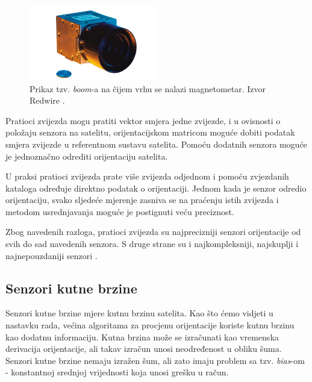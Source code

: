 \documentclass[times, utf8, diplomski, numeric]{templates/template}
\begin{document}
{{{{                \begin{figure}[htb]
                \centering
                \includegraphics[width=0.5\textwidth]{images/star_tracker.png}
                \caption{Prikaz tzv. \emph{boom}-a na čijem vrhu se nalazi magnetometar. Izvor Redwire \cite{starTrackerCite}.}
                \label{fig:star_tracker}
                \end{figure}

                Pratioci zvijezda mogu pratiti vektor smjera jedne zvijezde, i u ovisnosti o položaju senzora na satelitu, orijentacijskom matricom moguće dobiti podatak smjera zvijezde u referentnom sustavu satelita. Pomoću dodatnih senzora moguće je jednoznačno odrediti orijentaciju satelita. 

                U praksi pratioci zvijezda prate više zvijezda odjednom i pomoću zvjezdanih kataloga \cite{starCatalogs} određuje direktno podatak o orijentaciji. Jednom kada je senzor odredio orijentaciju, svako sljedeće mjerenje zasniva se na praćenju istih zvijezda i metodom usrednjavanja moguće je postignuti veću preciznost. 

                Zbog navedenih razloga, pratioci zvijezda su najprecizniji senzori orijentacije od svih do sad navedenih senzora. S druge strane su i najkompleksniji, najskuplji i najnepouzdaniji senzori \cite{adcsKnjiga}. 
            }
        }

        \subsection{Senzori kutne brzine}{
        \label{subsection:senzori_kutne_brzine}
            Senzori kutne brzine mjere kutnu brzinu satelita. Kao što ćemo vidjeti u nastavku rada, većina algoritama za procjenu orijentacije koriste kutnu brzinu kao dodatnu informaciju. Kutna brzina može se izračunati kao vremenska derivacija orijentacije, ali takav izračun unosi neodređenost u obliku šuma. Senzori kutne brzine nemaju izražen šum, ali zato imaju problem sa tzv. \emph{bias}-om - konstantnoj srednjoj vrijednosti koja unosi grešku u račun. 

}}}
\end{document}
